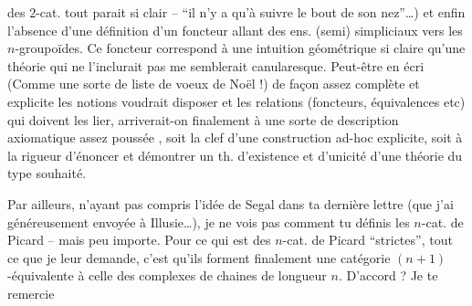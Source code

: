  des $2$-cat. tout parait si clair -- ``il n'y a qu'à suivre le bout de son nez''\dots) et enfin l'absence d'une définition d'un foncteur allant des ens. (semi) simpliciaux vers les $n$-groupoïdes. Ce foncteur correspond à une intuition géométrique si claire qu'une théorie qui ne l'inclurait pas me semblerait canularesque. Peut-être en écri (Comme une sorte de liste de voeux de Noël !) de façon assez complète et explicite les  notions  voudrait disposer et les relations (foncteurs, équivalences etc) qui doivent les lier, arriverait-on finalement à une sorte de description axiomatique assez poussée , soit  la clef d'une construction ad-hoc explicite, soit  à la rigueur d'énoncer et démontrer un th. d'existence et d'unicité d'une théorie du type souhaité.

Par ailleurs, n'ayant pas compris l'idée de Segal dans ta dernière lettre (que j'ai généreusement envoyée à Illusie\dots), je ne vois pas comment tu définis les $n$-cat. de Picard -- mais peu importe. Pour ce qui est des $n$-cat. de Picard ``strictes'', tout ce que je leur demande, c'est qu'ils forment finalement une catégorie $(n+1)$-équivalente à celle des complexes de chaines de longueur $n$. D'accord ? Je te remercie
